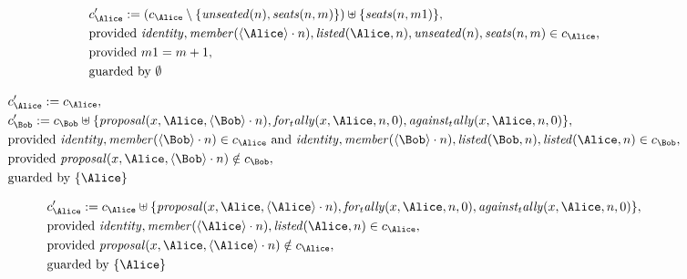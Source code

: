 \begin{align*}
&
c'_
{
\Alice
}
 := 
(c_
{
\Alice
}
 \setminus 
\{
\mathit{
unseated
}
(
n
)
,
\mathit{
seats
}
(
n
,
m
)
\}
) \uplus 
\{
\mathit{
seats
}
(
n
,
m1
)
\}
,\\
&
\text{provided } 
\mathit{
identity
}
,
\mathit{
member
}
(
\langle
\Alice
\rangle
\cdot
n
)
,
\mathit{
listed
}
(
\Alice
,
n
)
,
\mathit{
unseated
}
(
n
)
,
\mathit{
seats
}
(
n
,
m
)
 \in c_
{
\Alice
}
,\\
&
\text{provided } 
m1
=
m
+ 1
,\\
&
\text{guarded by } \emptyset
\end{align*}

\begin{align*}
&
c'_
{
\Alice
}
 := 
c_
{
\Alice
}
,\\
&
c'_
{
\Bob
}
 := 
c_
{
\Bob
}
 \uplus 
\{
\mathit{
proposal
}
(
x
,
\Alice
,
\langle
\Bob
\rangle
\cdot
n
)
,
\mathit{
for_tally
}
(
x
,
\Alice
,
n
,
0
)
,
\mathit{
against_tally
}
(
x
,
\Alice
,
n
,
0
)
\}
,\\
&
\text{provided } 
\mathit{
identity
}
,
\mathit{
member
}
(
\langle
\Bob
\rangle
\cdot
n
)
 \in c_
{
\Alice
}
 \text{ and } 
\mathit{
identity
}
,
\mathit{
member
}
(
\langle
\Bob
\rangle
\cdot
n
)
,
\mathit{
listed
}
(
\Bob
,
n
)
,
\mathit{
listed
}
(
\Alice
,
n
)
 \in c_
{
\Bob
}
,\\
&
\text{provided } 
\mathit{
proposal
}
(
x
,
\Alice
,
\langle
\Bob
\rangle
\cdot
n
)
 \notin c_
{
\Bob
}
,\\
&
\text{guarded by } \{
\Alice
\}
\end{align*}

\begin{align*}
&
c'_
{
\Alice
}
 := 
c_
{
\Alice
}
 \uplus 
\{
\mathit{
proposal
}
(
x
,
\Alice
,
\langle
\Alice
\rangle
\cdot
n
)
,
\mathit{
for_tally
}
(
x
,
\Alice
,
n
,
0
)
,
\mathit{
against_tally
}
(
x
,
\Alice
,
n
,
0
)
\}
,\\
&
\text{provided } 
\mathit{
identity
}
,
\mathit{
member
}
(
\langle
\Alice
\rangle
\cdot
n
)
,
\mathit{
listed
}
(
\Alice
,
n
)
 \in c_
{
\Alice
}
,\\
&
\text{provided } 
\mathit{
proposal
}
(
x
,
\Alice
,
\langle
\Alice
\rangle
\cdot
n
)
 \notin c_
{
\Alice
}
,\\
&
\text{guarded by } \{
\Alice
\}
\end{align*}

